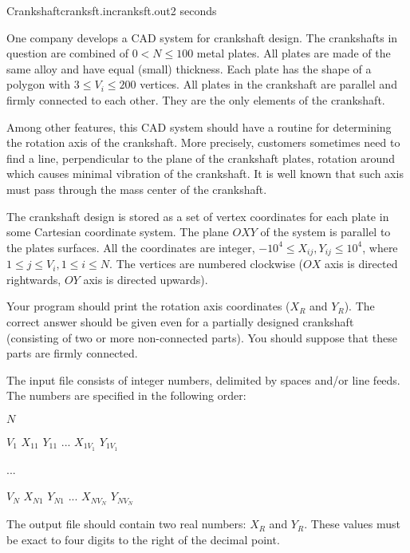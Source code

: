 \begin{problem}{Crankshaft}{cranksft.in}{cranksft.out}{2 seconds}

One company develops a CAD system for crankshaft design. 
The crankshafts in question are combined of ${0 < N \le 100}$ metal 
plates. All plates are made of the same alloy and have equal (small) 
thickness. Each plate has the shape of a polygon with ${3 \le V_i \le 200}$ 
vertices. All plates in the crankshaft are parallel and firmly connected 
to each other. They are the only elements of the crankshaft. 

Among other features, this CAD system should have a routine for determining 
the rotation axis of the crankshaft. More precisely, customers sometimes
need to find a line, perpendicular to the plane of the crankshaft plates, 
rotation around which causes minimal vibration of the crankshaft. It is well
known that such axis must pass through the mass center of the crankshaft.

The crankshaft design is stored as a set of vertex coordinates for each plate
in some Cartesian coordinate system. The plane $OXY$ of the system is parallel to
the plates surfaces. All the coordinates are integer, ${-10^4 \le X_{ij}, 
Y_{ij} \le 10^4}$, where ${1 \le j \le V_i, 1 \le i \le N}$. The vertices 
are numbered clockwise ($OX$ axis is directed rightwards, $OY$ axis is directed
upwards). 

Your program should print the rotation axis coordinates ($X_R$ and $Y_R$). 
The correct answer should be given even for a partially designed 
crankshaft (consisting of two or more non-connected parts). You should suppose
that these parts are firmly connected.

\InputFile

The input file consists of integer numbers, delimited by spaces and/or
line feeds. The numbers are specified in the following order:

$N$
\par
$V_1$ $X_{11}$ $Y_{11}$ ... $X_{1V_1}$ $Y_{1V_1}$
\par
...
\par
$V_N$ $X_{N1}$ $Y_{N1}$ ... $X_{N{V_N}}$ $Y_{N{V_N}}$

\OutputFile

The output file should contain two real numbers: $X_R$ and $Y_R$.
These values must be exact to four digits to the right of the decimal point. 

\Example

\begin{example}
\end{example}

\end{problem}
